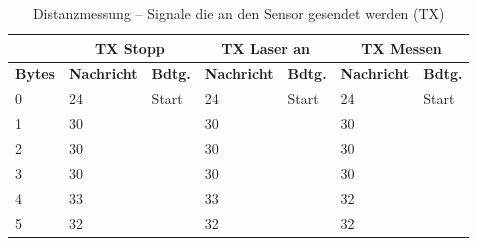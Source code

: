 \pagebreak[1]
\begin{table}[!ht]
	\centering
	\caption{Distanzmessung – Signale die an den Sensor gesendet werden (TX)}
	\label{Steuerung:tab:TX1}
	\begin{tabular}{lllllll}
		\hline
		                        & \multicolumn{2}{c}{TX Stopp} & \multicolumn{2}{c}{ TX Laser an}                   & \multicolumn{2}{c}{TX Messen}                                                                                                                   \\ \hline
		\textbf{Bytes}          & \textbf{Nachricht}           & \textbf{Bdtg.}                                     & \textbf{Nachricht}            & \textbf{Bdtg.}                                     & \textbf{Nachricht}         & \textbf{Bdtg.}                \\ \hline
		\multicolumn{1}{l|}{0}  & \cellcolor[HTML]{9AFF99}24   & \multicolumn{1}{l|}{\cellcolor[HTML]{9AFF99}Start} & \cellcolor[HTML]{9AFF99}24    & \multicolumn{1}{l|}{\cellcolor[HTML]{9AFF99}Start} & \cellcolor[HTML]{9AFF99}24 & \cellcolor[HTML]{9AFF99}Start \\
		\multicolumn{1}{l|}{1}  & \cellcolor[HTML]{FCFF2F}30   & \multicolumn{1}{l|}{\cellcolor[HTML]{FCFF2F}}      & \cellcolor[HTML]{FCFF2F}30    & \multicolumn{1}{l|}{\cellcolor[HTML]{FCFF2F}}      & \cellcolor[HTML]{FCFF2F}30 & \cellcolor[HTML]{FCFF2F}      \\
		\multicolumn{1}{l|}{2}  & \cellcolor[HTML]{FCFF2F}30   & \multicolumn{1}{l|}{\cellcolor[HTML]{FCFF2F}}      & \cellcolor[HTML]{FCFF2F}30    & \multicolumn{1}{l|}{\cellcolor[HTML]{FCFF2F}}      & \cellcolor[HTML]{FCFF2F}30 & \cellcolor[HTML]{FCFF2F}      \\
		\multicolumn{1}{l|}{3}  & \cellcolor[HTML]{FCFF2F}30   & \multicolumn{1}{l|}{\cellcolor[HTML]{FCFF2F}}      & \cellcolor[HTML]{FCFF2F}30    & \multicolumn{1}{l|}{\cellcolor[HTML]{FCFF2F}}      & \cellcolor[HTML]{FCFF2F}30 & \cellcolor[HTML]{FCFF2F}      \\
		\multicolumn{1}{l|}{4}  & 33                           & \multicolumn{1}{l|}{}                              & 33                            & \multicolumn{1}{l|}{}                              & 32                         &                               \\
		\multicolumn{1}{l|}{5}  & 32                           & \multicolumn{1}{l|}{}                              & 32                            & \multicolumn{1}{l|}{}                              & 32                         &                               \\

\end{tabular}
\end{table}
